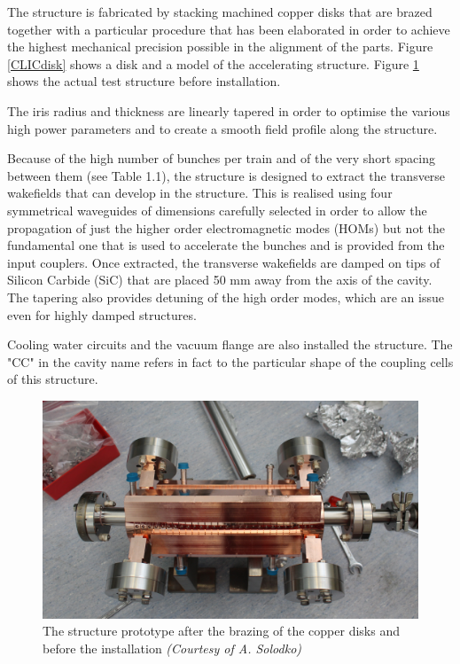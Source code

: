 The structure is fabricated by stacking machined copper disks that are brazed together with a particular procedure that has been elaborated in order to achieve the highest mechanical precision possible in the alignment of the parts. Figure \ref{CLICdisk} shows a disk and a model of the accelerating structure. Figure \ref{td26_test_photo} shows the actual test structure before installation.

The iris radius and thickness are linearly tapered in order to optimise the various high power parameters and to create a smooth field profile along the structure. 

Because of the high number of bunches per train and of the very short spacing between them (see Table 1.1), the structure is designed to extract the transverse wakefields that can develop in the structure. This is realised using four symmetrical waveguides of dimensions carefully selected in order to allow the propagation of just the higher order electromagnetic modes (HOMs) but not the fundamental one that is used to accelerate the bunches and is provided from the input couplers. Once extracted, the transverse wakefields are damped on tips of Silicon Carbide (SiC) that are placed 50 mm away from the axis of the cavity.
The tapering also provides detuning of the high order modes, which are an issue even for highly damped structures.

Cooling water circuits and the vacuum flange are also installed the structure. The "CC" in the cavity name refers in fact to the particular shape of the coupling cells of this structure.

\begin{figure}[h]
\centering

\includegraphics[scale=0.16]{pictures/td26_test_photo}
\caption{The structure prototype after the brazing of the copper disks and before the installation \textit{(Courtesy of A. Solodko)}}
\label{td26_test_photo}

\end{figure}


